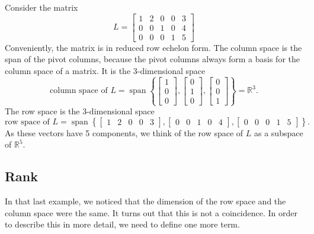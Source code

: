 \begin{example}
Consider the matrix 
\begin{equation*}
L =
\begin{bmatrix}
{1} & 2 & 0 & 0 & 3 \\
0 & 0 & {1} & 0 & 4 \\
0 & 0 & 0 & {1} & 5
\end{bmatrix} 
\end{equation*}
Conveniently, the matrix is in reduced row echelon form. The column space is the span of the pivot columns, because the pivot columns always form a basis for the column space of a matrix.
It is the 3-dimensional space
\begin{equation*}
\text{column space of $L$} =
\operatorname{span} \left\{
\begin{bmatrix}
1 \\
0 \\
0
\end{bmatrix} 
,
\begin{bmatrix}
0 \\
1 \\
0
\end{bmatrix} 
,
\begin{bmatrix}
0 \\
0 \\
1
\end{bmatrix} 
\right\}
= {\mathbb{R}}^3 .
\end{equation*}
The row space is the 3-dimensional space
\begin{equation*}
\text{row space of $L$} =
\operatorname{span} \left\{
\begin{bmatrix}
1 & 2 & 0 & 0 & 3
\end{bmatrix} 
,
\begin{bmatrix}
0 & 0 & 1 & 0 & 4
\end{bmatrix} 
,
\begin{bmatrix}
0 & 0 & 0 & 1 & 5
\end{bmatrix} 
\right\} .
\end{equation*}
As these vectors have 5 components, we think of the row space of $L$
as a subspace of ${\mathbb{R}}^5$.
\end{example}


\subsection{Rank}
In that last example, we noticed that the dimension of the row space and the column space were the same. It turns out that this is not a coincidence. In order to describe this in more detail, we need to define one more term.

